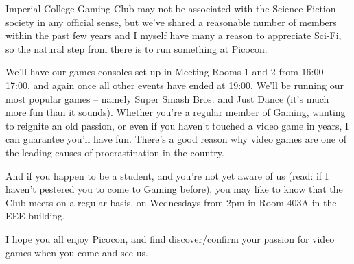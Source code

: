 Imperial College Gaming Club may not be associated with the Science Fiction society in any official sense, but we’ve shared a reasonable number of members within the past few years and I myself have many a reason to appreciate Sci-Fi, so the natural step from there is to run something at Picocon.

We’ll have our games consoles set up in Meeting Rooms 1 and 2 from 16:00 – 17:00, and again once all other events have ended at 19:00. We’ll be running our most popular games – namely Super Smash Bros. and Just Dance (it’s much more fun than it sounds). Whether you’re a regular member of Gaming, wanting to reignite an old passion, or even if you haven’t touched a video game in years, I can guarantee you’ll have fun. There’s a good reason why video games are one of the leading causes of procrastination in the country.

And if you happen to be a student, and you’re not yet aware of us (read: if I haven’t pestered you to come to Gaming before), you may like to know that the Club meets on a regular basis, on Wednesdays from 2pm in Room 403A in the EEE building.

I hope you all enjoy Picocon, and find discover/confirm your passion for video games when you come and see us.

